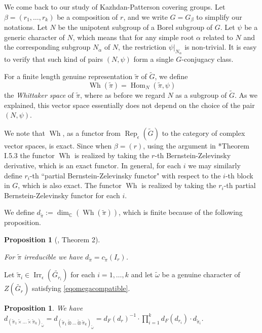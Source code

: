 \documentclass{amsart}
\numberwithin{equation}{section}
\newtheorem{proposition}[theorem]{\bf{Proposition}}
\newcommand{\rest}{\lvert}
\newcommand{\mrdim}{\operatorname{dim}}
\newcommand{\mrhom}{\operatorname{Hom}}
\newcommand{\mrirr}{\operatorname{Irr}}
\newcommand{\mrrep}{\operatorname{Rep}}
\newcommand{\mrwh}{\operatorname{Wh}}
\newcommand{\mbc}{\mathbb{C}}
\newcommand{\dF}[1]{d_{F}(#1)}
\newcommand{\wt}[1]{\widetilde{#1}}
\begin{document}
	We come back to our study of Kazhdan-Patterson covering groups. Let $\beta=(r_{1},\dots,r_{k})$ be a composition of $r$, and we write $G=G_{\beta}$ to simplify our notations. Let $N$ be the unipotent subgroup of a Borel subgroup of $G$. Let $\psi$ be a generic character of $N$, which means that for any simple root $\alpha$ related to $N$ and the corresponding subgroup $N_{\alpha}$ of $N$, the restriction $\psi\rest_{N_{\alpha}}$ is non-trivial. It is easy to verify that such kind of pairs $(N,\psi)$ form a single $G$-conjugacy class. 
	
	For a finite length genuine representation $\wt{\pi}$ of $\wt{G}$, we define 
	$$\mrwh(\wt{\pi})=\mrhom_{N}(\wt{\pi},\psi)$$
	the \emph{Whittaker space} of $\wt{\pi}$, where as before we regard $N$ as a subgroup of $\wt{G}$. As we explained, this vector space essentially does not depend on the choice of the pair $(N,\psi)$.
	
	We note that $\mrwh$, as a functor from $\mrrep_{\epsilon}(\wt{G})$ to the category of complex vector spaces, is exact. Since when $\beta=(r)$, using the argument in \cite{kazhdan1984metaplectic}*{Theorem I.5.3} the functor $\mrwh$ is realized by taking the $r$-th Bernstein-Zelevinsky derivative, which is an exact functor. In general, for each $i$ we may similarly define $r_{i}$-th ``partial Bernstein-Zelevinsky functor" with respect to the $i$-th block in $G$, which is also exact. The functor $\mrwh$ is realized by taking the $r_{i}$-th partial Bernstein-Zelevinsky functor for each $i$.
	
	We define $d_{\wt{\pi}}:=\mrdim_{\mbc}(\mrwh(\wt{\pi}))$, which is finite because of the following proposition.
	
	\begin{proposition}[\cite{patel2014theorem}, Theorem 2]\label{propwhitdim}
		
		For $\wt{\pi}$ irreducible we have $d_{\wt{\pi}}=c_{\wt{\pi}}(I_{r})$. 
		
	\end{proposition}
	
	Let $\wt{\pi}_{i}\in\mrirr_{\epsilon}(\wt{G_{r_{i}}})$ for each $i=1,\dots,k$ and let $\wt{\omega}$ be a genuine character of $Z(\wt{G_{r}})$ satisfying \eqref{eqomegacompatible}.
	
	\begin{proposition} \label{propwhitdimBZprod}
		We have
		$ d_{(\wt{\pi}_{1}\wt{\times}\dots\wt{\times}\wt{\pi}_{k})_{\wt{\omega}}}=d_{(\wt{\pi}_{1}\wt{\otimes}\dots\wt{\otimes}\wt{\pi}_{k})_{\wt{\omega}}}=\dF{d_{r}}^{-1}\cdot\prod_{i=1}^{k}\dF{d_{r_{i}}}\cdot d_{\wt{\pi}_{i}}$.
		
	\end{proposition}
	
\end{document}
